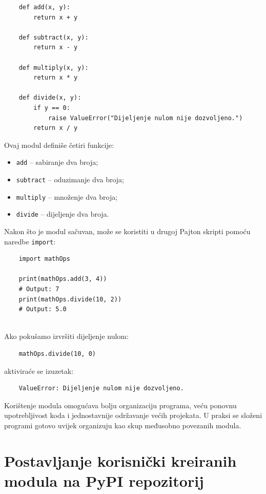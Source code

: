 \begin{verbatim}
	def add(x, y):
	    return x + y
	
	def subtract(x, y):
	    return x - y
	
	def multiply(x, y):
	    return x * y
	
	def divide(x, y):
	    if y == 0:
	        raise ValueError("Dijeljenje nulom nije dozvoljeno.")
	    return x / y
\end{verbatim}

Ovaj modul definiše četiri funkcije:

\begin{itemize}
	\item \texttt{add} -- sabiranje dva broja;
	\item \texttt{subtract} -- oduzimanje dva broja;
	\item \texttt{multiply} -- množenje dva broja;
	\item \texttt{divide} -- dijeljenje dva broja.
\end{itemize}

Nakon što je modul sačuvan, može se koristiti u drugoj Pajton skripti pomoću naredbe \texttt{import}:

\begin{verbatim}
	import mathOps
	
	print(mathOps.add(3, 4))
	# Output: 7
	print(mathOps.divide(10, 2))
	# Output: 5.0
	
\end{verbatim}

Ako pokušamo izvršiti dijeljenje nulom:

\begin{verbatim}
	mathOps.divide(10, 0)
\end{verbatim}

aktiviraće se izuzetak:

\begin{verbatim}
	ValueError: Dijeljenje nulom nije dozvoljeno.
\end{verbatim}

Korištenje modula omogućava bolju organizaciju programa, veću ponovnu upotrebljivost koda i jednostavnije održavanje većih projekata. U praksi se složeni programi gotovo uvijek organizuju kao skup međusobno povezanih modula.

\section{Postavljanje korisnički kreiranih modula na PyPI repozitorij}

